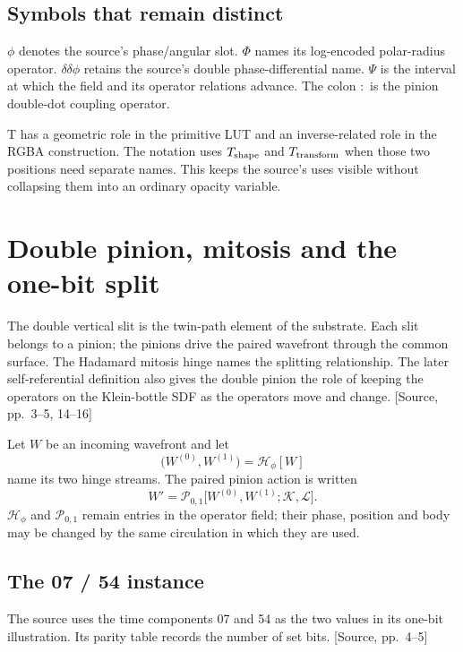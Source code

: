 \documentclass[11pt,a4paper]{article}
\newcommand{\src}[1]{{\sffamily\footnotesize\color{DWGray}[Source, pp.~#1]}}
\newcommand{\Klein}{\mathcal{K}}
\newcommand{\LUT}{\mathcal{L}}
\begin{document}
\subsection{Symbols that remain distinct}
$\phi$ denotes the source's phase/angular slot. $\Phi$ names its log-encoded polar-radius operator. $\delta\delta\phi$ retains the source's double phase-differential name. $\Psi$ is the interval at which the field and its operator relations advance. The colon $:$ is the pinion double-dot coupling operator.

T has a geometric role in the primitive LUT and an inverse-related role in the RGBA construction. The notation uses $T_{\rm shape}$ and $T_{\rm transform}$ when those two positions need separate names. This keeps the source's uses visible without collapsing them into an ordinary opacity variable.
\clearpage

\section{Double pinion, mitosis and the one-bit split}
The double vertical slit is the twin-path element of the substrate. Each slit belongs to a pinion; the pinions drive the paired wavefront through the common surface. The Hadamard mitosis hinge names the splitting relationship. The later self-referential definition also gives the double pinion the role of keeping the operators on the Klein-bottle SDF as the operators move and change. \src{3--5, 14--16}

Let $W$ be an incoming wavefront and let
\begin{equation}
\bigl(W^{(0)},W^{(1)}\bigr)=\mathcal{H}_{\phi}[W]
\end{equation}
name its two hinge streams. The paired pinion action is written
\begin{equation}
W'=\mathcal{P}_{0,1}\bigl[W^{(0)},W^{(1)};\Klein,\LUT\bigr].
\end{equation}
$\mathcal{H}_{\phi}$ and $\mathcal{P}_{0,1}$ remain entries in the operator field; their phase, position and body may be changed by the same circulation in which they are used.

\subsection{The 07 / 54 instance}
The source uses the time components 07 and 54 as the two values in its one-bit illustration. Its parity table records the number of set bits. \src{4--5}
\end{document}
